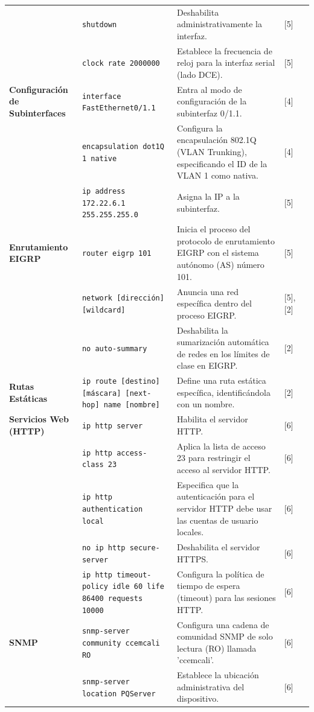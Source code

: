 \documentclass[a5paper]{book}%
\begin{document}
\begin{longtable}{|p{2cm}|p{3cm}|p{4cm}|p{2cm}|p{2cm}|}
& \texttt{shutdown} & Deshabilita administrativamente la interfaz. & [5] \\
& \texttt{clock rate 2000000} & Establece la frecuencia de reloj para la interfaz serial (lado DCE). & [5] \\
\textbf{Configuración de Subinterfaces} & \texttt{interface FastEthernet0/1.1} & Entra al modo de configuración de la subinterfaz 0/1.1. & [4] \\
& \texttt{encapsulation dot1Q 1 native} & Configura la encapsulación 802.1Q (VLAN Trunking), especificando el ID de la VLAN 1 como nativa. & [4] \\
& \texttt{ip address 172.22.6.1 255.255.255.0} & Asigna la IP a la subinterfaz. & [5] \\
\textbf{Enrutamiento EIGRP} & \texttt{router eigrp 101} & Inicia el proceso del protocolo de enrutamiento EIGRP con el sistema autónomo (AS) número 101. & [5] \\
& \texttt{network [dirección] [wildcard]} & Anuncia una red específica dentro del proceso EIGRP. & [5], [2] \\
& \texttt{no auto-summary} & Deshabilita la sumarización automática de redes en los límites de clase en EIGRP. & [2] \\
\textbf{Rutas Estáticas} & \texttt{ip route [destino] [máscara] [next-hop] name [nombre]} & Define una ruta estática específica, identificándola con un nombre. & [2] \\
\textbf{Servicios Web (HTTP)} & \texttt{ip http server} & Habilita el servidor HTTP. & [6] \\
& \texttt{ip http access-class 23} & Aplica la lista de acceso 23 para restringir el acceso al servidor HTTP. & [6] \\
& \texttt{ip http authentication local} & Especifica que la autenticación para el servidor HTTP debe usar las cuentas de usuario locales. & [6] \\
& \texttt{no ip http secure-server} & Deshabilita el servidor HTTPS. & [6] \\
& \texttt{ip http timeout-policy idle 60 life 86400 requests 10000} & Configura la política de tiempo de espera (timeout) para las sesiones HTTP. & [6] \\
\textbf{SNMP} & \texttt{snmp-server community ccemcali RO} & Configura una cadena de comunidad SNMP de solo lectura (RO) llamada 'ccemcali'. & [6] \\
& \texttt{snmp-server location PQServer} & Establece la ubicación administrativa del dispositivo. & [6] \\

\end{longtable}
\end{document}
